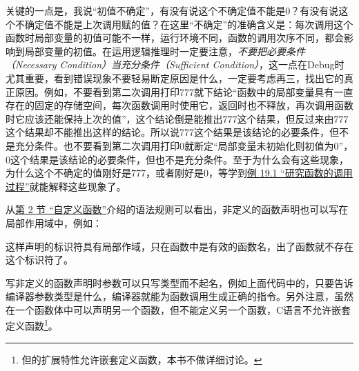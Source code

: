 关键的一点是，我说“初值不确定”，有没有说这个不确定值不能是0？有没有说这个不确定值不能是上次调用赋的值？在这里“不确定”的准确含义是：每次调用这个函数时局部变量的初值可能不一样，运行环境不同，函数的调用次序不同，都会影响到局部变量的初值。在运用逻辑推理时一定要注意，\emph{不要把必要条件（Necessary Condition）当充分条件（Sufficient Condition）}，这一点在Debug时尤其重要，看到错误现象不要轻易断定原因是什么，一定要考虑再三，找出它的真正原因。例如，不要看到第二次调用打印777就下结论“函数中的局部变量具有一直存在的固定的存储空间，每次函数调用时使用它，返回时也不释放，再次调用函数时它应该还能保持上次的值”，这个结论倒是能推出777这个结果，但反过来由777这个结果却不能推出这样的结论。所以说777这个结果是该结论的必要条件，但不是充分条件。也不要看到第二次调用打印0就断定“局部变量未初始化则初值为0”，0这个结果是该结论的必要条件，但也不是充分条件。至于为什么会有这些现象，为什么这个不确定的值刚好是777，或者刚好是0，等学到\hyperlink{db.ch19s01.id2774388}{例 19.\BookSplit{}1 “研究函数的调用过程”}就能解释这些现象了。



从\hyperlink{db.ch03s02.id2712975}{第 2 节 “自定义函数”}介绍的语法规则可以看出，非定义的函数声明也可以写在局部作用域中，例如：




这样声明的标识符具有局部作域，只在函数中是有效的函数名，出了函数就不存在这个标识符了。



写非定义的函数声明时参数可以只写类型而不起名，例如上面代码中的，只要告诉编译器参数类型是什么，编译器就能为函数调用生成正确的指令。另外注意，虽然在一个函数体中可以声明另一个函数，但不能定义另一个函数，C语言不允许嵌套定义函数\footnote[5]{但的扩展特性允许嵌套定义函数，本书不做详细讨论。}。

